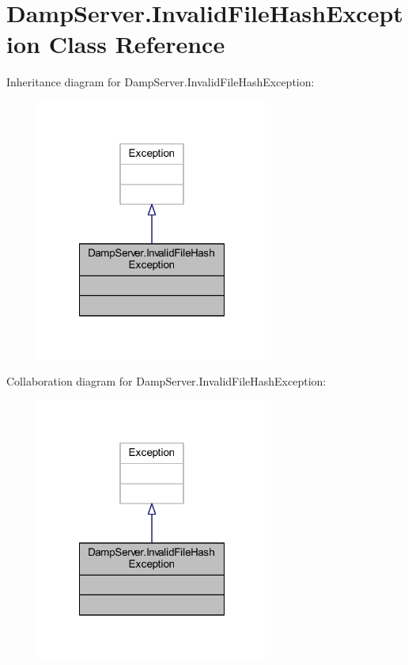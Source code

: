 \hypertarget{class_damp_server_1_1_invalid_file_hash_exception}{\section{Damp\-Server.\-Invalid\-File\-Hash\-Exception Class Reference}
\label{class_damp_server_1_1_invalid_file_hash_exception}
}


Inheritance diagram for Damp\-Server.\-Invalid\-File\-Hash\-Exception\-:\nopagebreak
\begin{figure}[H]
\begin{center}
\leavevmode
\includegraphics[width=216pt]{class_damp_server_1_1_invalid_file_hash_exception__inherit__graph}
\end{center}
\end{figure}


Collaboration diagram for Damp\-Server.\-Invalid\-File\-Hash\-Exception\-:\nopagebreak
\begin{figure}[H]
\begin{center}
\leavevmode
\includegraphics[width=216pt]{class_damp_server_1_1_invalid_file_hash_exception__coll__graph}
\end{center}
\end{figure}


